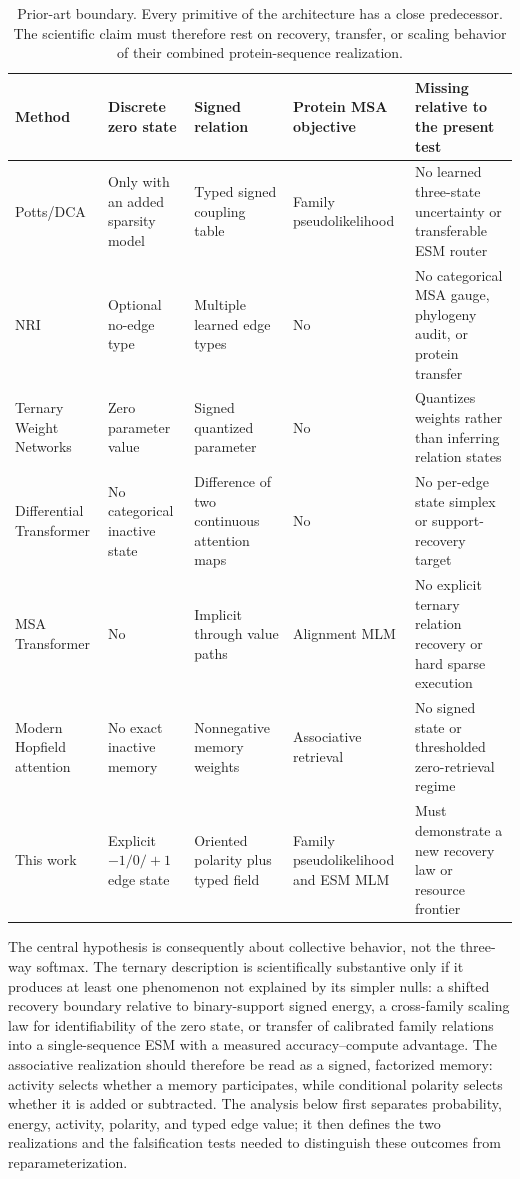 \documentclass[10pt,twocolumn]{article}
\newcommand{\1}{\mathbf 1}
\theoremstyle{remark}
\begin{document}
\begin{table}[t]
\centering
\small
\begin{tabular}{p{}p{}p{}p{}p{}}
\toprule
Method & Discrete zero state & Signed relation & Protein MSA objective & Missing relative to the present test \\
\midrule
Potts/DCA \cite{morcos2011,ekeberg2013} & Only with an added sparsity model & Typed signed coupling
table & Family pseudolikelihood & No learned three-state uncertainty or transferable ESM router \\
NRI \cite{kipf2018} & Optional no-edge type & Multiple learned edge types & No & No categorical MSA
gauge, phylogeny audit, or protein transfer \\
Ternary Weight Networks \cite{li2016} & Zero parameter value & Signed quantized parameter & No &
Quantizes weights rather than inferring relation states \\
Differential Transformer \cite{ye2024} & No categorical inactive state & Difference of two continuous
attention maps & No & No per-edge state simplex or support-recovery target \\
MSA Transformer \cite{rao2021} & No & Implicit through value paths & Alignment MLM & No explicit
ternary relation recovery or hard sparse execution \\
Modern Hopfield attention \cite{ramsauer2021} & No exact inactive memory & Nonnegative memory
weights & Associative retrieval & No signed state or thresholded zero-retrieval regime \\
This work & Explicit $-1/0/+1$ edge state & Oriented polarity plus typed field & Family
pseudolikelihood and ESM MLM & Must demonstrate a new recovery law or resource frontier \\
\bottomrule
\end{tabular}
\caption{Prior-art boundary.  Every primitive of the architecture has a close predecessor.  The
scientific claim must therefore rest on recovery, transfer, or scaling behavior of their combined
protein-sequence realization.}
\label{tab:prior-art-boundary}
\end{table}

The central hypothesis is consequently about collective behavior, not the three-way softmax.  The
ternary description is scientifically substantive only if it produces at least one phenomenon not
explained by its simpler nulls: a shifted recovery boundary relative to binary-support signed
energy, a cross-family scaling law for identifiability of the zero state, or transfer of calibrated
family relations into a single-sequence ESM with a measured accuracy--compute advantage.  The
associative realization should therefore be read as a signed, factorized memory: activity selects
whether a memory participates, while conditional polarity selects whether it is added or
subtracted.  The analysis below first separates probability, energy, activity, polarity, and typed edge value; it
then defines the two realizations and the falsification tests needed to distinguish these outcomes
from reparameterization.
\end{document}
